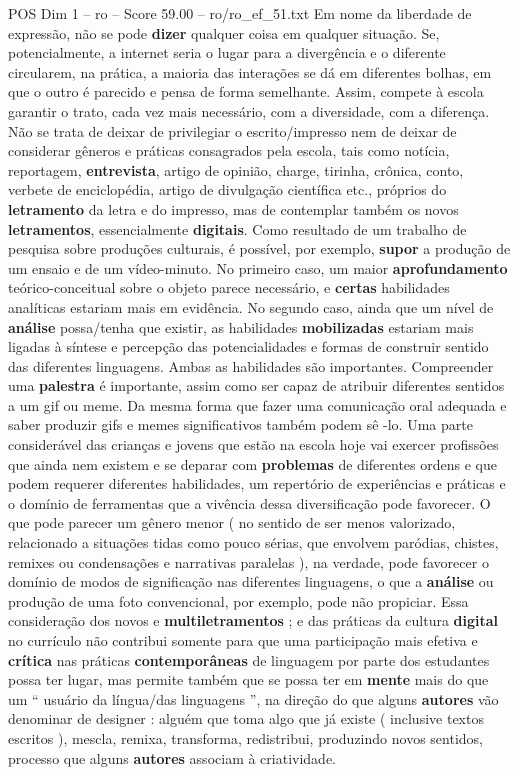 \begin{textsample}{POS Dim 1 – ro – Score 59.00 – ro/ro\_ef\_51.txt}
Em nome da liberdade de expressão, não se pode \textbf{dizer} qualquer coisa em qualquer situação.
Se, potencialmente, a internet seria o lugar para a divergência e o diferente circularem, na prática, a maioria das interações se dá em diferentes bolhas, em que o outro é parecido e pensa de forma semelhante.
Assim, compete à escola garantir o trato, cada vez mais necessário, com a diversidade, com a diferença.
Não se trata de deixar de privilegiar o escrito/impresso nem de deixar de considerar gêneros e práticas consagrados pela escola, tais como notícia, reportagem, \textbf{entrevista}, artigo de opinião, charge, tirinha, crônica, conto, verbete de enciclopédia, artigo de divulgação científica etc., próprios do \textbf{letramento} da letra e do impresso, mas de contemplar também os novos \textbf{letramentos}, essencialmente \textbf{digitais}.
Como resultado de um trabalho de pesquisa sobre produções culturais, é possível, por exemplo, \textbf{supor} a produção de um ensaio e de um vídeo-minuto.
No primeiro caso, um maior \textbf{aprofundamento} teórico-conceitual sobre o objeto parece necessário, e \textbf{certas} habilidades analíticas estariam mais em evidência.
No segundo caso, ainda que um nível de \textbf{análise} possa/tenha que existir, as habilidades \textbf{mobilizadas} estariam mais ligadas à síntese e percepção das potencialidades e formas de construir sentido das diferentes linguagens.
Ambas as habilidades são importantes.
Compreender uma \textbf{palestra} é importante, assim como ser capaz de atribuir diferentes sentidos a um gif ou meme.
Da mesma forma que fazer uma comunicação oral adequada e saber produzir gifs e memes significativos também podem sê -lo.
Uma parte considerável das crianças e jovens que estão na escola hoje vai exercer profissões que ainda nem existem e se deparar com \textbf{problemas} de diferentes ordens e que podem requerer diferentes habilidades, um repertório de experiências e práticas e o domínio de ferramentas que a vivência dessa diversificação pode favorecer.
O que pode parecer um gênero menor ( no sentido de ser menos valorizado, relacionado a situações tidas como pouco sérias, que envolvem paródias, chistes, remixes ou condensações e narrativas paralelas ), na verdade, pode favorecer o domínio de modos de significação nas diferentes linguagens, o que a \textbf{análise} ou produção de uma foto convencional, por exemplo, pode não propiciar.
Essa consideração dos novos e \textbf{multiletramentos} ; e das práticas da cultura \textbf{digital} no currículo não contribui somente para que uma participação mais efetiva e \textbf{crítica} nas práticas \textbf{contemporâneas} de linguagem por parte dos estudantes possa ter lugar, mas permite também que se possa ter em \textbf{mente} mais do que um “ usuário da língua/das linguagens ”, na direção do que alguns \textbf{autores} vão denominar de designer : alguém que toma algo que já existe ( inclusive textos escritos ), mescla, remixa, transforma, redistribui, produzindo novos sentidos, processo que alguns \textbf{autores} associam à criatividade.

\end{textsample}
